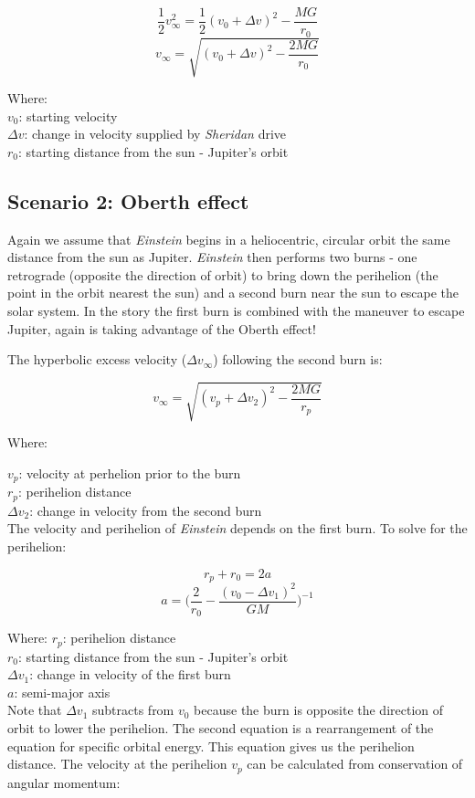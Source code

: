 \documentclass[12pt]{article} %
\begin{document}
$$\frac{1}{2}v_{\infty}^{2} = \frac{1}{2} (v_0 + \Delta v)^2 - \frac{MG}{r_0}$$
$$v_{\infty} = \sqrt{(v_0 + \Delta v)^2-\frac{2MG}{r_0}}$$

Where:\\
$v_0$: starting velocity\\
$\Delta v$: change in velocity supplied by \textit{Sheridan} drive\\
$r_0$: starting distance from the sun - Jupiter's orbit


\subsection{Scenario 2: Oberth effect}

Again we assume that \textit{Einstein} begins in a heliocentric, circular orbit the same distance from the sun as Jupiter. \textit{Einstein} then performs two burns - one retrograde (opposite the direction of orbit) to bring down the perihelion (the point in the orbit nearest the sun) and a second burn near the sun to escape the solar system. In the story the first burn is combined with the maneuver to escape Jupiter, again is taking advantage of the Oberth effect!

The hyperbolic excess velocity ($\Delta v_{\infty}$) following the second burn is:

$$v_{\infty} = \sqrt{(v_p + \Delta v_2)^2-\frac{2MG}{r_p}}$$

Where:

$v_p$: velocity at perhelion prior to the burn\\
$r_p$: perihelion distance\\
$\Delta v_2$: change in velocity from the second burn\\

The velocity and perihelion of \textit{Einstein} depends on the first burn. To solve for the perihelion:

$$r_p + r_0 = 2a$$
$$a = \bigg(\frac{2}{r_0} - \frac{(v_0-\Delta v_1)^2}{GM}\bigg)^{-1}$$

Where:
$r_p$: perihelion distance\\
$r_0$: starting distance from the sun - Jupiter's orbit\\
$\Delta v_1$: change in velocity of the first burn\\
$a$: semi-major axis\\

Note that $\Delta v_1$ subtracts from $v_0$ because the burn is opposite the direction of orbit to lower the perihelion. The second equation is a rearrangement of the equation for specific orbital energy. This equation gives us the perihelion distance. The velocity at the perihelion $v_p$ can be calculated from conservation of angular momentum:
\end{document}
